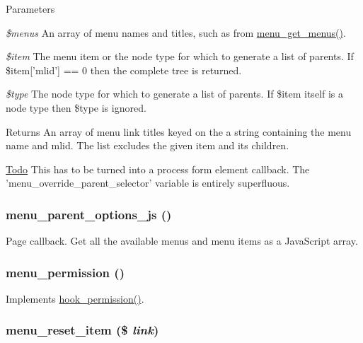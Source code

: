 \begin{DoxyParams}{Parameters}
\item[{\em \$menus}]An array of menu names and titles, such as from \hyperlink{menu_8module_a25bb9c595512dd1485c988e268407845}{menu\_\-get\_\-menus()}. \item[{\em \$item}]The menu item or the node type for which to generate a list of parents. If \$item\mbox{[}'mlid'\mbox{]} == 0 then the complete tree is returned. \item[{\em \$type}]The node type for which to generate a list of parents. If \$item itself is a node type then \$type is ignored. \end{DoxyParams}
\begin{DoxyReturn}{Returns}
An array of menu link titles keyed on the a string containing the menu name and mlid. The list excludes the given item and its children.
\end{DoxyReturn}
\begin{Desc}
\item[\hyperlink{todo__todo000017}{Todo}]This has to be turned into a process form element callback. The 'menu\_\-override\_\-parent\_\-selector' variable is entirely superfluous. \end{Desc}
\hypertarget{menu_8module_a6143cb84d59ed645141e35bbc1de8325}{
\subsubsection[{menu\_\-parent\_\-options\_\-js}]{\setlength{\rightskip}{0pt plus 5cm}menu\_\-parent\_\-options\_\-js ()}}
\label{menu_8module_a6143cb84d59ed645141e35bbc1de8325}
Page callback. Get all the available menus and menu items as a JavaScript array. \hypertarget{menu_8module_a409234819573fb6e0fe8d87c4d7c25ec}{
\subsubsection[{menu\_\-permission}]{\setlength{\rightskip}{0pt plus 5cm}menu\_\-permission ()}}
\label{menu_8module_a409234819573fb6e0fe8d87c4d7c25ec}
Implements \hyperlink{group__hooks_ga2b22b45f4925f2478412477bae329713}{hook\_\-permission()}. \hypertarget{menu_8module_a4f49ddc59d8da61e8b1b9679922f2e11}{
\subsubsection[{menu\_\-reset\_\-item}]{\setlength{\rightskip}{0pt plus 5cm}menu\_\-reset\_\-item (\$ {\em link})}}
